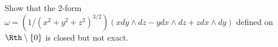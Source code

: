 Show that the $2$-form $\omega=(1/(x^2+y^2+z^2)^{3/2})(x dy\wedge dz-y
dx\wedge dz+z dx\wedge dy)$ defined on $\Rth\setminus \{0\}$ is closed
but not exact.

